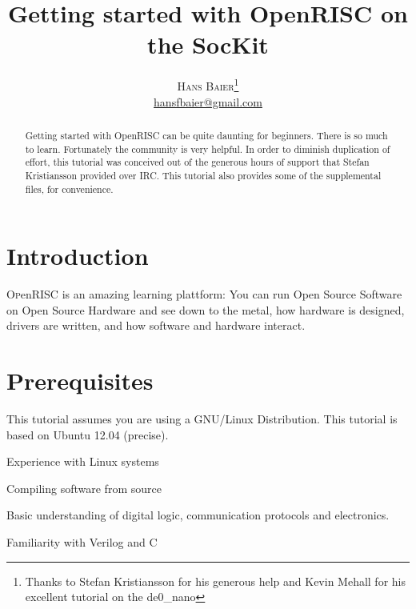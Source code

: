 \documentclass[twoside]{article}
\title{\vspace{-15mm}\fontsize{24pt}{10pt}\selectfont\textbf{Getting
    started with OpenRISC on the SocKit}} %
\author{
\large
\textsc{Hans Baier}\thanks{Thanks to Stefan Kristiansson for his
  generous help and Kevin Mehall for his excellent tutorial on the de0\_nano}\\[2mm] 
\normalsize \href{mailto:hansfbaier@gmail.com}{hansfbaier@gmail.com} %
\vspace{-5mm}
}
\date{}
\begin{document}
\maketitle %

\thispagestyle{fancy} %


\begin{abstract}

  \noindent Getting started with OpenRISC can be quite daunting for
  beginners. There is so much to learn. Fortunately the community is
  very helpful. In order to diminish duplication of effort, this
  tutorial was conceived out of the generous hours of support that
  Stefan Kristiansson provided over IRC. This tutorial also provides
  some of the supplemental files, for convenience.

\end{abstract}



\section{Introduction}

\lettrine[nindent=0em,lines=3]{O} penRISC is an amazing learning
plattform: You can run Open Source Software on Open Source Hardware
and see down to the metal, how hardware is designed, drivers are
written, and how software and hardware interact.  


\section{Prerequisites}
This tutorial assumes you are using a GNU/Linux Distribution. This
tutorial is based on Ubuntu 12.04 (precise).

\begin{compactitem}
\item Experience with Linux systems
\item Compiling software from source
\item Basic understanding of digital logic, communication protocols
  and electronics.
\item Familiarity with Verilog and C
\end{compactitem}
\end{document}
